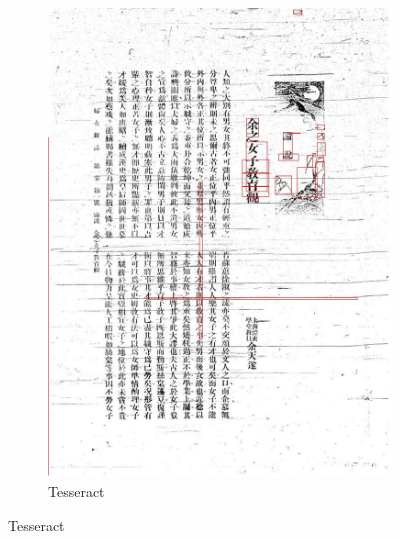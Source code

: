 \documentclass{beamer}
\begin{document}
\begin{frame}
\begin{figure}[htbp]
\begin{subfigure}[b]{0.23\linewidth}
            \includegraphics[width=\linewidth]{./figures/samples/tesseract_01.jpg}
            \caption{Tesseract}
            \label{fig:tesseract_01}
        \end{subfigure}
        \label{fig:detection_compare}
    \end{figure}
\end{frame}
\end{document}
